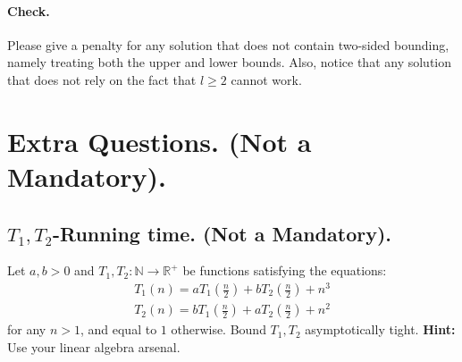 \ifdefined\CHECK
  \paragraph{Check.} Please give a penalty for any solution that does not contain two-sided bounding, namely treating both the upper and lower bounds. Also, notice that any solution that does not rely on the fact that $l\ge 2$ cannot work. 
\fi


\fi
\section*{Extra Questions. (Not a Mandatory).}

\subsection{$T_{1},T_{2}$-Running time. (Not a Mandatory).}
Let $a,b>0$ and $T_{1},T_{2} : \mathbb{N} \rightarrow \mathbb{R}^{+}$ be functions satisfying the equations:
\begin{equation*}
  \begin{split}
    T_{1}\left( n \right) = aT_{1}\left(\frac{n}{2} \right) + bT_{2}\left(\frac{n}{2} \right) + n^{3}\\ 
    T_{2}\left( n \right) = bT_{1}\left(\frac{n}{2} \right) + aT_{2}\left(\frac{n}{2} \right) + n^{2} 
  \end{split}
\end{equation*}
for any $n>1$, and equal to $1$ otherwise. Bound $T_{1}, T_{2}$ asymptotically tight. \textbf{Hint:} Use your linear algebra arsenal.

\ifdefined\BOOK
\ifdefined\SOLUTION
